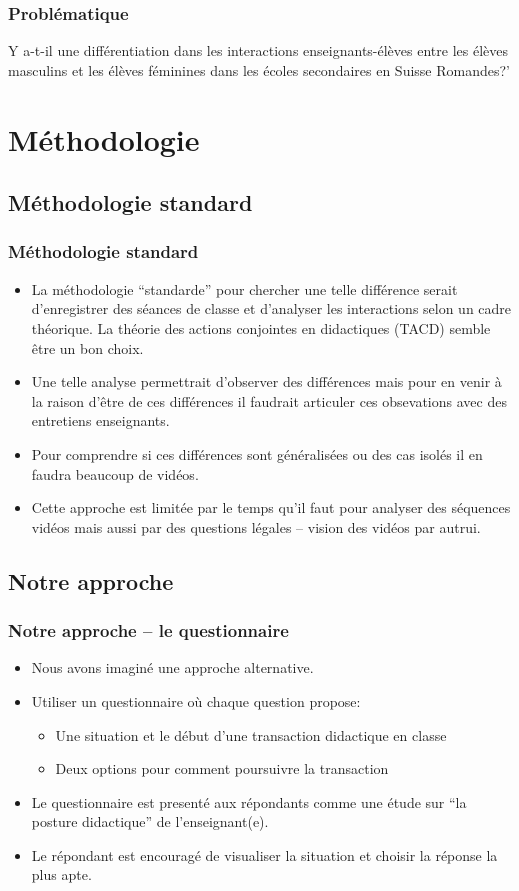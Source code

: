 \documentclass{beamer}
\begin{document}
\begin{frame}
\frametitle{Problématique}
\begin{block}{ }
  Y a-t-il une différentiation dans les interactions enseignants-élèves
  entre les élèves masculins et les élèves féminines dans les écoles
  secondaires en Suisse Romandes?'
\end{block}
\end{frame}

\section{Méthodologie}
\subsection{Méthodologie standard}
\begin{frame}
\frametitle{Méthodologie standard}
\begin{itemize}
\item La méthodologie ``standarde'' pour chercher une telle différence serait d'enregistrer des séances de classe et d'analyser
les interactions selon un cadre théorique. La théorie des actions conjointes en didactiques (TACD) semble être un bon choix.
\item Une telle analyse permettrait d'observer des différences mais pour en venir à la raison d'être de ces différences il faudrait articuler ces obsevations avec des entretiens enseignants.
\item Pour comprendre si ces différences sont généralisées ou des cas isolés il en faudra beaucoup de vidéos.
\item Cette approche est limitée par le temps qu'il faut pour analyser des séquences vidéos mais aussi par des questions
légales -- vision des vidéos par autrui.  
\end{itemize}
\end{frame}

\subsection{Notre approche}
\begin{frame}
\frametitle{Notre approche -- le questionnaire}
\begin{itemize}
\item Nous avons imaginé une approche alternative.
\item Utiliser un questionnaire où chaque question propose:
  \begin{itemize}
   \item Une situation et le début d'une transaction didactique en classe
   \item Deux options pour comment poursuivre la transaction 
  \end{itemize}
\item Le questionnaire est presenté aux répondants comme une étude sur
  ``la posture didactique'' de l'enseignant(e).
\item Le répondant est encouragé de visualiser la situation et choisir la
  réponse la plus apte. 
\end{itemize}
\end{frame}
\end{document}
